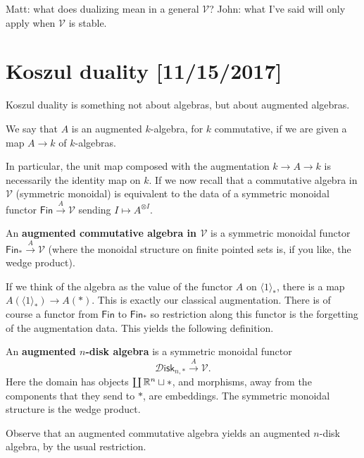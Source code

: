 \documentclass{amsart}
\begin{document}
Matt: what does dualizing mean in a general $\mathcal{V}$?
John: what I've said will only apply when $\mathcal{V}$ is stable.

\newpage

\section{Koszul duality [11/15/2017]}

Koszul duality is something not about algebras, but about augmented algebras.
\begin{definition}
    We say that $A$ is an augmented $k$-algebra, for $k$ commutative, if we are given a map
    $A\to k$ of $k$-algebras.
\end{definition}
In particular, the unit map composed with the augmentation $k\to A\to k$ is necessarily
the identity map on $k$. If we now recall that a commutative algebra in $\mathcal{V}$
(symmetric monoidal) is equivalent to the data of a symmetric monoidal functor $\mathsf{Fin}\xrightarrow{A}\mathcal{V}$
sending $I\mapsto A^{\otimes I}$.
\begin{definition}
    An \textbf{augmented commutative algebra in $\mathcal{V}$} is a symmetric monoidal
    functor $\mathsf{Fin}_*\xrightarrow{A}\mathcal{V}$ (where the monoidal structure on
    finite pointed sets is, if you like, the wedge product).
\end{definition}
If we think of the algebra as the value of the functor $A$ on $\langle 1\rangle_*$,
there is a map $A(\langle 1\rangle_*)\to A(*)$. This is exactly our classical augmentation.
There is of course a functor from $\mathsf{Fin}$ to $\mathsf{Fin}_*$ so restriction
along this functor is the forgetting of the augmentation data.
This yields the following definition.
\begin{definition}
    An \textbf{augmented $n$-disk algebra} is a symmetric monoidal functor
    \begin{equation*}
        \mathcal{D}\mathsf{isk}_{n,*} \xrightarrow{A} \mathcal{V}.
    \end{equation*}
    Here the domain has objects $\coprod\mathbb{R}^n\sqcup *$, and morphisms, away from
    the components that they send to $*$, are embeddings. The symmetric monoidal
    structure is the wedge product.
\end{definition}
Observe that an augmented commutative algebra yields an augmented $n$-disk algebra,
by the usual restriction.
\end{document}
